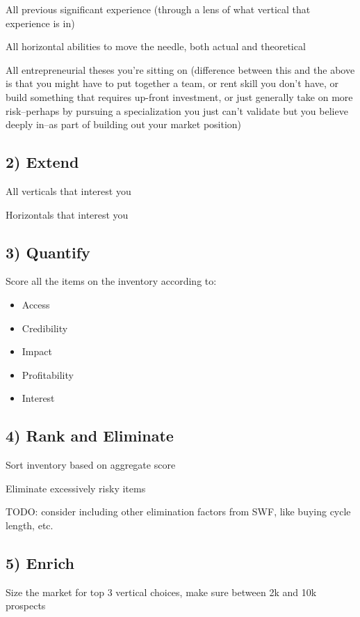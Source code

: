 All previous significant experience (through a lens of what vertical that experience is in)

All horizontal abilities to move the needle, both actual and theoretical

All entrepreneurial theses you're sitting on (difference between this and the above is that you might have to put together a team, or rent skill you don't have, or build something that requires up-front investment, or just generally take on more risk--perhaps by pursuing a specialization you just can't validate but you believe deeply in--as part of building out your market position)

\subsection{2) Extend}

All verticals that interest you

Horizontals that interest you

\subsection{3) Quantify}

Score all the items on the inventory according to:

\begin{itemize}
\item Access
\item Credibility
\item Impact
\item Profitability
\item Interest
\end{itemize}

\subsection{4) Rank and Eliminate}

Sort inventory based on aggregate score

Eliminate excessively risky items

TODO: consider including other elimination factors from SWF, like buying cycle length, etc.

\subsection{5) Enrich}

Size the market for top 3 vertical choices, make sure between 2k and 10k prospects

